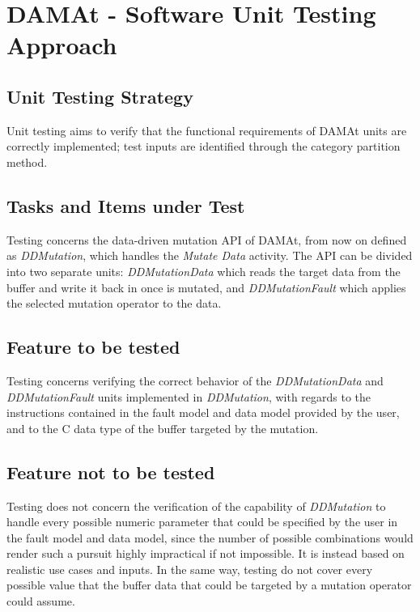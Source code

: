 
\chapter{DAMAt - Software Unit Testing Approach}
\label{chap:approach_DAMAt}


\section{Unit Testing Strategy}

Unit testing aims to verify that the functional requirements of DAMAt units are correctly implemented; test inputs are identified through the category partition method.


\section{Tasks and Items under Test}

Testing concerns the data-driven mutation API of DAMAt, from now on defined as \emph{DDMutation}, which handles the \emph{Mutate Data} activity.
The API can be divided into two separate units: \emph{DDMutationData} which reads the target data from the buffer and write it back in once is mutated, and \emph{DDMutationFault} which applies the selected mutation operator to the data.

\section{Feature to be tested}

Testing concerns verifying the correct behavior of the \emph{DDMutationData} and \emph{DDMutationFault} units implemented in \emph{DDMutation}, with regards to the instructions contained in the fault model and data model provided by the user, and to the C data type of the buffer targeted by the mutation.

\section{Feature not to be tested}

Testing does not concern the verification of the capability of \emph{DDMutation} to handle every possible numeric parameter that could be specified by the user in the fault model and data model, since the number of possible combinations would render such a pursuit highly impractical if not impossible.
It is instead based on realistic use cases and inputs.
In the same way, testing do not cover every possible value that the buffer data that could be targeted by a mutation operator could assume.


